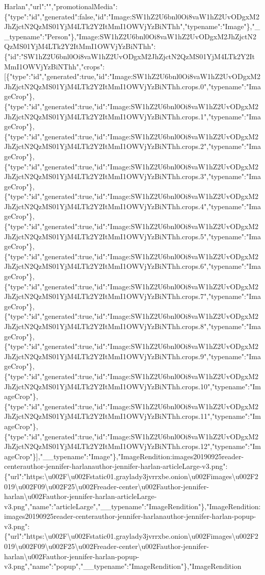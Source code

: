 Harlan","url":"","promotionalMedia":\{"type":"id","generated":false,"id":"Image:SW1hZ2U6bnl0Oi8vaW1hZ2UvODgxM2JhZjctN2QzMS01YjM4LTk2Y2ItMmI1OWVjYzBiNThh","typename":"Image"\},"\_\_typename":"Person"\},"Image:SW1hZ2U6bnl0Oi8vaW1hZ2UvODgxM2JhZjctN2QzMS01YjM4LTk2Y2ItMmI1OWVjYzBiNThh":\{"id":"SW1hZ2U6bnl0Oi8vaW1hZ2UvODgxM2JhZjctN2QzMS01YjM4LTk2Y2ItMmI1OWVjYzBiNThh","crops":{[}\{"type":"id","generated":true,"id":"Image:SW1hZ2U6bnl0Oi8vaW1hZ2UvODgxM2JhZjctN2QzMS01YjM4LTk2Y2ItMmI1OWVjYzBiNThh.crops.0","typename":"ImageCrop"\},\{"type":"id","generated":true,"id":"Image:SW1hZ2U6bnl0Oi8vaW1hZ2UvODgxM2JhZjctN2QzMS01YjM4LTk2Y2ItMmI1OWVjYzBiNThh.crops.1","typename":"ImageCrop"\},\{"type":"id","generated":true,"id":"Image:SW1hZ2U6bnl0Oi8vaW1hZ2UvODgxM2JhZjctN2QzMS01YjM4LTk2Y2ItMmI1OWVjYzBiNThh.crops.2","typename":"ImageCrop"\},\{"type":"id","generated":true,"id":"Image:SW1hZ2U6bnl0Oi8vaW1hZ2UvODgxM2JhZjctN2QzMS01YjM4LTk2Y2ItMmI1OWVjYzBiNThh.crops.3","typename":"ImageCrop"\},\{"type":"id","generated":true,"id":"Image:SW1hZ2U6bnl0Oi8vaW1hZ2UvODgxM2JhZjctN2QzMS01YjM4LTk2Y2ItMmI1OWVjYzBiNThh.crops.4","typename":"ImageCrop"\},\{"type":"id","generated":true,"id":"Image:SW1hZ2U6bnl0Oi8vaW1hZ2UvODgxM2JhZjctN2QzMS01YjM4LTk2Y2ItMmI1OWVjYzBiNThh.crops.5","typename":"ImageCrop"\},\{"type":"id","generated":true,"id":"Image:SW1hZ2U6bnl0Oi8vaW1hZ2UvODgxM2JhZjctN2QzMS01YjM4LTk2Y2ItMmI1OWVjYzBiNThh.crops.6","typename":"ImageCrop"\},\{"type":"id","generated":true,"id":"Image:SW1hZ2U6bnl0Oi8vaW1hZ2UvODgxM2JhZjctN2QzMS01YjM4LTk2Y2ItMmI1OWVjYzBiNThh.crops.7","typename":"ImageCrop"\},\{"type":"id","generated":true,"id":"Image:SW1hZ2U6bnl0Oi8vaW1hZ2UvODgxM2JhZjctN2QzMS01YjM4LTk2Y2ItMmI1OWVjYzBiNThh.crops.8","typename":"ImageCrop"\},\{"type":"id","generated":true,"id":"Image:SW1hZ2U6bnl0Oi8vaW1hZ2UvODgxM2JhZjctN2QzMS01YjM4LTk2Y2ItMmI1OWVjYzBiNThh.crops.9","typename":"ImageCrop"\},\{"type":"id","generated":true,"id":"Image:SW1hZ2U6bnl0Oi8vaW1hZ2UvODgxM2JhZjctN2QzMS01YjM4LTk2Y2ItMmI1OWVjYzBiNThh.crops.10","typename":"ImageCrop"\},\{"type":"id","generated":true,"id":"Image:SW1hZ2U6bnl0Oi8vaW1hZ2UvODgxM2JhZjctN2QzMS01YjM4LTk2Y2ItMmI1OWVjYzBiNThh.crops.11","typename":"ImageCrop"\},\{"type":"id","generated":true,"id":"Image:SW1hZ2U6bnl0Oi8vaW1hZ2UvODgxM2JhZjctN2QzMS01YjM4LTk2Y2ItMmI1OWVjYzBiNThh.crops.12","typename":"ImageCrop"\}{]},"\_\_typename":"Image"\},"ImageRendition:images20190925reader-centerauthor-jennifer-harlanauthor-jennifer-harlan-articleLarge-v3.png":\{"url":"https:\textbackslash{}u002F\textbackslash{}u002Fstatic01.graylady3jvrrxbe.onion\textbackslash{}u002Fimages\textbackslash{}u002F2019\textbackslash{}u002F09\textbackslash{}u002F25\textbackslash{}u002Freader-center\textbackslash{}u002Fauthor-jennifer-harlan\textbackslash{}u002Fauthor-jennifer-harlan-articleLarge-v3.png","name":"articleLarge","\_\_typename":"ImageRendition"\},"ImageRendition:images20190925reader-centerauthor-jennifer-harlanauthor-jennifer-harlan-popup-v3.png":\{"url":"https:\textbackslash{}u002F\textbackslash{}u002Fstatic01.graylady3jvrrxbe.onion\textbackslash{}u002Fimages\textbackslash{}u002F2019\textbackslash{}u002F09\textbackslash{}u002F25\textbackslash{}u002Freader-center\textbackslash{}u002Fauthor-jennifer-harlan\textbackslash{}u002Fauthor-jennifer-harlan-popup-v3.png","name":"popup","\_\_typename":"ImageRendition"\},"ImageRendition